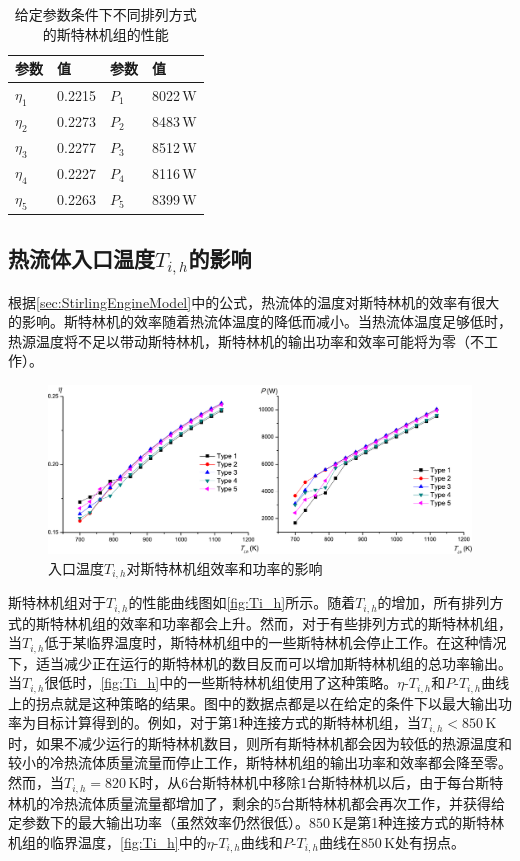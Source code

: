 \begin{table}[htbp]
\setlength{\abovecaptionskip}{0pt}
	\caption{给定参数条件下不同排列方式的斯特林机组的性能}
	\centering
	\begin{tabular}{p{2cm}<{\centering} p{2.5cm}<{\centering} p{2cm}<{\centering} p{2.5cm}<{\centering}}
		\toprule
		参数		&	值	&	参数		&	值\\
		\midrule
		$\eta_1$	&	0.2215	&	$P_1$		&	8022\,W\\
		$\eta_2$	&	0.2273	&	$P_2$		&	8483\,W\\
		$\eta_3$	&	0.2277	&	$P_3$		&	8512\,W\\
		$\eta_4$	&	0.2227	&	$P_4$		&	8116\,W\\
		$\eta_5$	&	0.2263	&	$P_5$		&	8399\,W\\		
		\bottomrule
	\end{tabular}
	\label{tab:result}
\end{table}

\subsection{热流体入口温度$T_{i,h}$的影响}
\label{sec:T_i_h}
根据\autoref{sec:StirlingEngineModel}中的公式，热流体的温度对斯特林机的效率有很大的影响。斯特林机的效率随着热流体温度的降低而减小。当热流体温度足够低时，热源温度将不足以带动斯特林机，斯特林机的输出功率和效率可能将为零（不工作）。
\begin{figure}[htpb]
\centering
	\includegraphics[width = 0.95\columnwidth]{fig/T_ih}
	\caption{入口温度$T_{i,h}$对斯特林机组效率和功率的影响}
	\label{fig:Ti_h}
\end{figure}
斯特林机组对于$T_{i,h}$的性能曲线图如\autoref{fig:Ti_h}所示。随着$T_{i,h}$的增加，所有排列方式的斯特林机组的效率和功率都会上升。然而，对于有些排列方式的斯特林机组，当$T_{i,h}$低于某临界温度时，斯特林机组中的一些斯特林机会停止工作。在这种情况下，适当减少正在运行的斯特林机的数目反而可以增加斯特林机组的总功率输出。当$T_{i,h}$很低时，\autoref{fig:Ti_h}中的一些斯特林机组使用了这种策略。$\eta$-$T_{i,h}$和$P$-$T_{i,h}$曲线上的拐点就是这种策略的结果。图中的数据点都是以在给定的条件下以最大输出功率为目标计算得到的。例如，对于第1种连接方式的斯特林机组，当$T_{i,h} < 850\,\mathrm{K}$时，如果不减少运行的斯特林机数目，则所有斯特林机都会因为较低的热源温度和较小的冷热流体质量流量而停止工作，斯特林机组的输出功率和效率都会降至零。然而，当$T_{i,h} = 820\,\mathrm{K}$时，从6台斯特林机中移除1台斯特林机以后，由于每台斯特林机的冷热流体质量流量都增加了，剩余的5台斯特林机都会再次工作，并获得给定参数下的最大输出功率（虽然效率仍然很低）。$850\,\mathrm{K}$是第1种连接方式的斯特林机组的临界温度，\autoref{fig:Ti_h}中的$\eta$-$T_{i,h}$曲线和$P$-$T_{i,h}$曲线在$850\,\mathrm{K}$处有拐点。

